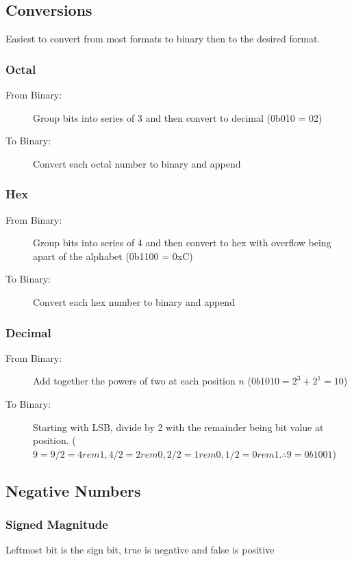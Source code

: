 \subsection{Conversions}
Easiest to convert from most formats to binary then to the desired format.

\subsubsection{Octal}
\begin{description}
	\item[From Binary:] Group bits into series of 3 and then convert to decimal (0b010 = 02)
	\item[To Binary:] Convert each octal number to binary and append
\end{description}

\subsubsection{Hex}
\begin{description}
	\item[From Binary:] Group bits into series of 4 and then convert to hex with overflow being apart of the alphabet (0b1100 = 0xC)
	\item[To Binary:] Convert each hex number to binary and append
\end{description}

\subsubsection{Decimal}
\begin{description}
	\item[From Binary:] Add together the powers of two at each position $n$ ($0b1010 = 2^3 + 2^1 = 10$)
	\item[To Binary:] Starting with LSB, divide by 2 with the remainder being bit value at position. ($9 = 9/2 = 4 rem 1, 4/2 = 2 rem 0, 2/2 = 1 rem 0, 1/2 = 0 rem 1. \therefore 9 = 0b1001$)
\end{description}


\subsection{Negative Numbers}
\subsubsection{Signed Magnitude}
Leftmost bit is the sign bit, true is negative and false is positive

